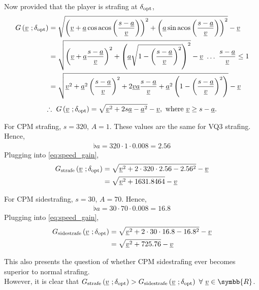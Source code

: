 Now provided that the player is strafing at $\delta_{\operatorname{opt}}$,
\begin{align*}
G\left(\flat{v}\ ;\delta_{\opt} \right) &= \sqrt{\left(\flat{v} + \flat{a}\cos{\acos\left( \frac{s - \flat{a}}{\flat{v}} \right)} \right)^2 + \left(\flat{a}\sin{\acos\left( \frac{s - \flat{a}}{\flat{v}} \right)} \right)^2} - \flat{v}\\
&= \sqrt{\left(\flat{v} + \flat{a}\frac{s - \flat{a}}{\flat{v}} \right)^2 + \left(\flat{a}\sqrt{1 - \left( \frac{s - \flat{a}}{\flat{v}} \right)^2} \right)^2} - \flat{v}\ \ldots\ \frac{s - \flat{a}}{\flat{v}} \leq 1\\
&= \sqrt{\flat{v}^2 + \flat{a}^2 \left( \frac{s - \flat{a}}{\flat{v}} \right)^2 + 2\flat{v}\flat{a}\frac{s - \flat{a}}{\flat{v}} + \flat{a}^2 \left( 1 - \left( \frac{s - \flat{a}}{\flat{v}} \right)^2 \right)} - \flat{v}
\end{align*}
\begin{align}
\label{eq:speed_gain}
\therefore\ G\left(\flat{v}\ ;\delta_{\opt} \right) = \sqrt{\flat{v}^2 + 2s\flat{a} - \flat{a}^2} - \flat{v},\ \text{where}\ \flat{v}\geq s - \flat{a}.
\end{align}

For CPM strafing, $s = 320$, $A = 1$. These values are the same for VQ3 strafing. Hence,
\begin{align*}
\flat{a} = 320\cdot 1\cdot 0.008 = 2.56
\end{align*}
Plugging into \eqref{eq:speed_gain},
\begin{align*}
G_{\text{strafe}}\left(\flat{v}\ ;\delta_{\opt} \right) &= \sqrt{\flat{v}^2 + 2\cdot 320 \cdot 2.56 - 2.56^2} - \flat{v}\\
&= \sqrt{\flat{v}^2 + 1631.8464} - \flat{v}
\end{align*}

For CPM sidestrafing, $s = 30$, $A = 70$. Hence,
\begin{align*}
\flat{a} = 30\cdot 70\cdot 0.008 = 16.8
\end{align*}
Plugging into \eqref{eq:speed_gain},
\begin{align*}
G_{\text{sidestrafe}}\left(\flat{v}\ ;\delta_{\opt} \right) &= \sqrt{\flat{v}^2 + 2\cdot 30 \cdot 16.8 - 16.8^2} - \flat{v}\\
&= \sqrt{\flat{v}^2 + 725.76} - \flat{v}
\end{align*}

This also presents the question of whether CPM sidestrafing ever becomes superior to normal strafing.\\
However, it is clear that $G_{\text{strafe}}\left(\flat{v}\ ;\delta_{\opt} \right) > G_{\text{sidestrafe}}\left(\flat{v}\ ;\delta_{\opt} \right)\ \forall\ \flat{v} \in \symbb{R}$.


